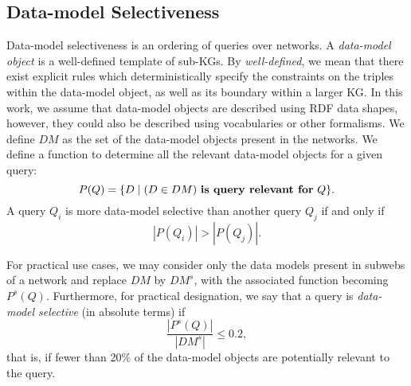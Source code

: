 \subsection{Data-model Selectiveness}
Data-model selectiveness is an ordering of queries over networks. 
A \emph{data-model object} is a well-defined template of sub-KGs. 
By \emph{well-defined}, we mean that there exist explicit rules which deterministically specify the constraints on the triples within the data-model object, as well as its boundary within a larger KG.  
In this work, we assume that data-model objects are described using RDF data shapes, however, they could also be described using vocabularies or other formalisms.
We define $DM$ as the set of the data-model objects present in the networks.
We define a function to determine all the relevant data-model objects for a given query:
\begin{equation}
   P(Q) = \{ D \mid (D \in DM) \text{ \textbf{is query relevant for} } Q \}.
\end{equation}
A query $Q_i$ is more data-model selective than another query $Q_j$ if and only if 
\begin{equation}
    \left| P(Q_i) \right| > \left| P(Q_j) \right|.
\end{equation}

For practical use cases, we may consider only the data models present in subwebs of a network and replace $DM$ by $DM^s$,
with the associated function becoming $P^s(Q)$.
Furthermore, for practical designation, we say that a query is \emph{data-model selective} (in absolute terms) if 
\begin{equation}
    \frac{\left| P^s(Q) \right|}{\left| DM^s \right|} \leq 0.2,
\end{equation}
that is, if fewer than 20\% of the data-model objects are potentially relevant to the query.